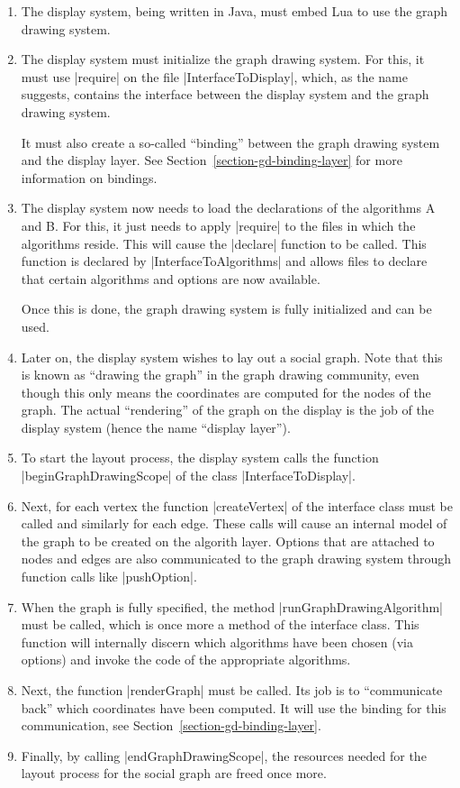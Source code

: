 \begin{enumerate}
\item The display system, being written in Java, must embed Lua to use the
  graph drawing system.
\item The display system must initialize the graph drawing system. For this,
  it must use |require| on the file |InterfaceToDisplay|, which, as
  the name suggests, contains the interface between the display
  system and the graph drawing system.
  
  It must also create a so-called ``binding'' between the
  graph drawing system and the display layer. See
  Section~\ref{section-gd-binding-layer} for more information on
  bindings.
\item The display system now needs to load the declarations of the
  algorithms A and B. For this, it just needs to apply |require| to
  the files in which the algorithms reside. This will cause the
  |declare| function to be called. This function is declared by
  |InterfaceToAlgorithms| and allows files to declare that certain
  algorithms and options are now available.

  Once this is done, the graph drawing system is fully initialized and
  can be used.
\item Later on, the display system wishes to lay out a social graph. Note
  that this is known as ``drawing the graph'' in the graph drawing
  community, even though this only means the coordinates are computed
  for the nodes of the graph. The actual ``rendering'' of the graph on
  the display is the job of the display system (hence the name ``display
  layer'').
\item To start the layout process, the display system calls the function
  |beginGraphDrawingScope| of the class |InterfaceToDisplay|.
\item Next, for each vertex the function |createVertex| of the
  interface class must be called and similarly for each edge. These
  calls will cause an internal model of the graph to be created on the
  algorith layer. Options that are attached to nodes and edges are
  also communicated to the graph drawing system through function calls
  like |pushOption|.
\item When the graph is fully specified, the method
  |runGraphDrawingAlgorithm| must be called, which is once more a
  method of the interface class. This function will internally discern
  which algorithms have been chosen (via options) and invoke the code
  of the appropriate algorithms.
\item Next, the function |renderGraph| must be called. Its job is to
  ``communicate back'' which coordinates have been computed. It will
  use the binding for this communication, see
  Section~\ref{section-gd-binding-layer}.
\item Finally, by calling |endGraphDrawingScope|, the resources needed
  for the layout process for the social graph are freed once more.
\end{enumerate}

